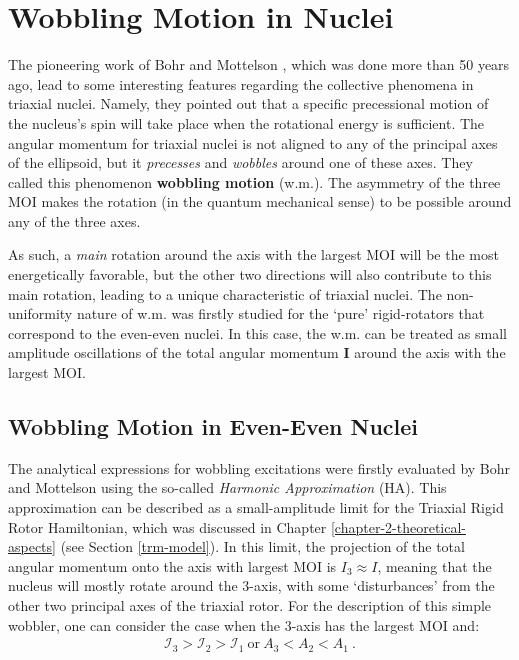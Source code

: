 \chapter{Wobbling Motion in Nuclei}
\label{chapter-3} %

The pioneering work of Bohr and Mottelson \cite{bohr1998nuclear}, which was done more than 50 years ago, lead to some interesting features regarding the collective phenomena in triaxial nuclei. Namely, they pointed out that a specific precessional motion of the nucleus's spin will take place when the rotational energy is sufficient. The angular momentum for triaxial nuclei is not aligned to any of the principal axes of the ellipsoid, but it \emph{precesses} and \emph{wobbles} around one of these axes. They called this phenomenon \textbf{wobbling motion} (w.m.). The asymmetry of the three MOI makes the rotation (in the quantum mechanical sense) to be possible around any of the three axes.

As such, a \emph{main} rotation around the axis with the largest MOI will be the most energetically favorable, but the other two directions will also contribute to this main rotation, leading to a unique characteristic of triaxial nuclei. The non-uniformity nature of w.m. was firstly studied for the `pure' rigid-rotators that correspond to the even-even nuclei. In this case, the w.m. can be treated as small amplitude oscillations of the total angular momentum $\mathbf{I}$ around the axis with the largest MOI.

\section{Wobbling Motion in Even-Even Nuclei}
\label{section-even-wobbling-theory}

The analytical expressions for wobbling excitations were firstly evaluated by Bohr and Mottelson using the so-called \emph{Harmonic Approximation} (HA). This approximation can be described as a small-amplitude limit for the Triaxial Rigid Rotor Hamiltonian, which was discussed in Chapter \ref{chapter-2-theoretical-aspects} (see Section \ref{trm-model}). In this limit, the projection of the total angular momentum onto the axis with largest MOI is $I_3\approx I$, meaning that the nucleus will mostly rotate around the $3$-axis, with some `disturbances' from the other two principal axes of the triaxial rotor. For the description of this simple wobbler, one can consider the case when the $3$-axis has the largest MOI and:
\begin{align}
    \mathcal{I}_3>\mathcal{I}_2>\mathcal{I}_1\ \text{or}\ A_3<A_2<A_1\ .
\end{align}


